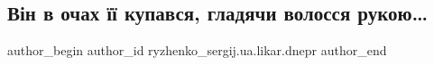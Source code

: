  
 
 
 
 

\subsection{Він в очах її купався, гладячи волосся рукою…}
\label{sec:10_01_2023.fb.ryzhenko_sergij.ua.likar.dnepr.1.v_n_v_ochakh___kupa}

\ifcmt
 author_begin
   author_id ryzhenko_sergij.ua.likar.dnepr
 author_end
\fi
